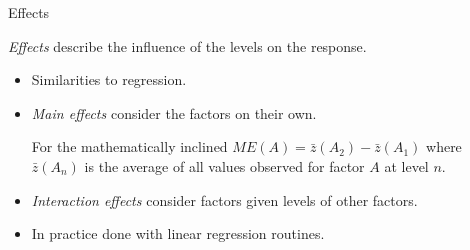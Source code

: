 \documentclass[english,usenames,dvipsnames,aspectratio=169]{beamer}
\begin{document}
\begin{frame}{Effects}

\Large
\emph{Effects} describe the influence of the levels on the response.
\normalsize

\begin{itemize}
\item Similarities to regression.
\item \emph{Main effects} consider the factors on their own.
\begin{block}{For the mathematically inclined}
  $ME(A) = \bar{z}(A_2) - \bar{z}(A_1)$ where $\bar{z}(A_n)$ is the
  average of all values observed for factor $A$ at level $n$.
\end{block}



\item \emph{Interaction effects} consider factors given levels of
  other factors.
\item In practice done with linear regression routines.
\end{itemize}

\end{frame}


\end{document}

